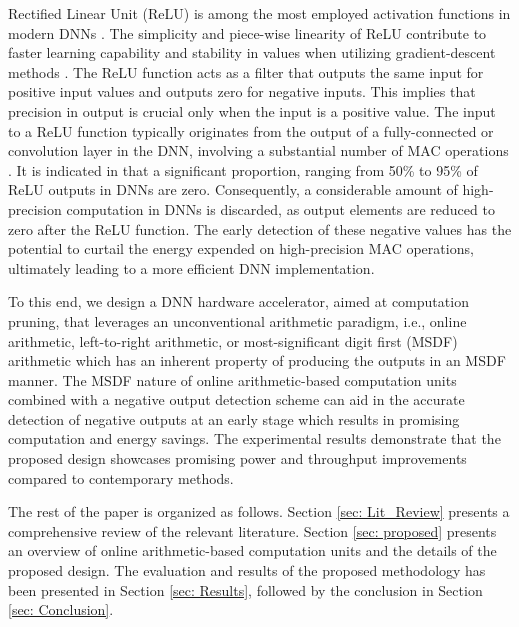 \documentclass[conference]{IEEEtran}
\begin{document}
Rectified Linear Unit (ReLU) is among the most employed activation functions in modern DNNs \cite{alom2018history}. The simplicity and piece-wise linearity of ReLU contribute to faster learning capability and stability in values when utilizing gradient-descent methods \cite{nwankpa2018activation}. The ReLU function acts as a filter that outputs the same input for positive input values and outputs zero for negative inputs. This implies that precision in output is crucial only when the input is a positive value. The input to a ReLU function typically originates from the output of a fully-connected or convolution layer in the DNN, involving a substantial number of MAC operations \cite{hanif2019hardware}. It is indicated in \cite{shi2017speeding} that a significant proportion, ranging from 50\% to 95\% of ReLU outputs in DNNs are zero. Consequently, a considerable amount of high-precision computation in DNNs is discarded, as output elements are reduced to zero after the ReLU function. The early detection of these negative values has the potential to curtail the energy expended on high-precision MAC operations, ultimately leading to a more efficient DNN implementation.

To this end, we design a DNN hardware accelerator, aimed at computation pruning, that leverages an unconventional arithmetic paradigm, i.e., online arithmetic, left-to-right arithmetic, or most-significant digit first (MSDF) arithmetic which has an inherent property of producing the outputs in an MSDF manner. The MSDF nature of online arithmetic-based computation units combined with a negative output detection scheme can aid in the accurate detection of negative outputs at an early stage which results in promising computation and energy savings. The experimental results demonstrate that the proposed design showcases promising power and throughput improvements compared to contemporary methods.

The rest of the paper is organized as follows. Section \ref{sec: Lit_Review} presents a comprehensive review of the relevant literature. Section \ref{sec: proposed} presents an overview of online arithmetic-based computation units and the details of the proposed design. The evaluation and results of the proposed methodology has been presented in Section \ref{sec: Results}, followed by the conclusion in Section \ref{sec: Conclusion}.
\end{document}
